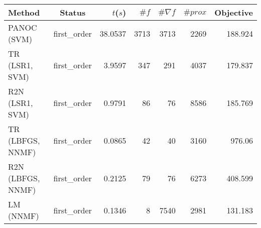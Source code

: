 \begin{tabular}{lcrrrrr}
  \hline
  \textbf{Method} & \textbf{Status} & \textbf{$t$($s$)} & \textbf{$\#f$} & \textbf{$\#\nabla f$} & \textbf{$\#prox$} & \textbf{Objective} \\\hline
  PANOC (SVM) & first\_order & 38.0537 & 3713 & 3713 & 2269 & 188.924 \\
  TR (LSR1, SVM) & first\_order & 3.9597 & 347 & 291 & 4037 & 179.837 \\
  R2N (LSR1, SVM) & first\_order & 0.9791 & 86 & 76 & 8586 & 185.769 \\
  TR (LBFGS, NNMF) & first\_order & 0.0865 & 42 & 40 & 3160 & 976.06 \\
  R2N (LBFGS, NNMF) & first\_order & 0.2125 & 79 & 76 & 6273 & 408.599 \\
  LM (NNMF) & first\_order & 0.1346 & 8 & 7540 & 2981 & 131.183 \\\hline
\end{tabular}
